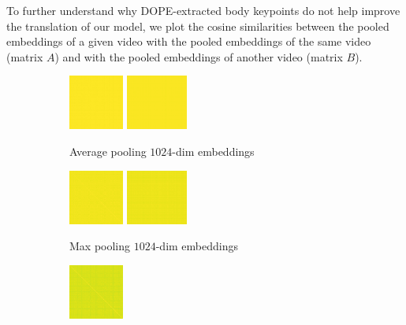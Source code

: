 \documentclass[final]{cvpr}
\begin{document}
To further understand why DOPE-extracted body keypoints do not help improve the translation of our model, we plot the cosine similarities between the pooled embeddings of a given video with the pooled embeddings of the same video (matrix $A$) and with the pooled embeddings of another video (matrix $B$).

\begin{figure}[h]
	\begin{subfigure}[t]{0.5\linewidth}
		\centering\captionsetup{width=.9\linewidth, justification=raggedright}
		\includegraphics[height=1.8cm]{fig/matrices/a_avg.png}
		\includegraphics[height=1.8cm]{fig/matrices/b_avg.png}
		\caption{\centering Average pooling $1024$-dim embeddings}
	\end{subfigure}\hfill
	\begin{subfigure}[t]{0.5\linewidth}
		\centering\captionsetup{width=.9\linewidth, justification=raggedright}
		\includegraphics[height=1.8cm]{fig/matrices/a_max.png}
		\includegraphics[height=1.8cm]{fig/matrices/b_max.png}
		\caption{\centering Max pooling $1024$-dim embeddings}
	\end{subfigure}
	\par\medskip
	\centering
	\begin{subfigure}[t]{0.5\linewidth}
		\captionsetup{width=.9\linewidth, justification=raggedright}
		\includegraphics[height=1.8cm]{fig/matrices/a_amax.png}

\end{subfigure}
\end{figure}
\end{document}
